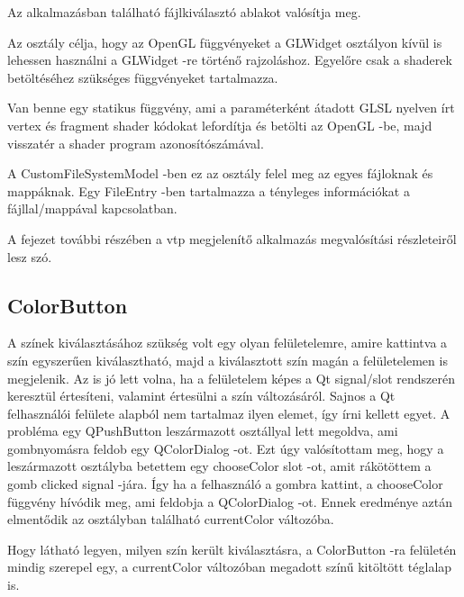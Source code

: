 \begin{description}[font=\normalfont\itshape\bfseries\space]
\item [OpenFileDialog:]
Az alkalmazásban található fájlkiválasztó ablakot valósítja meg.
\item [OpenGLInterface:]
Az osztály célja, hogy az OpenGL függvényeket 
a {\ttfamily GLWidget} osztályon kívül is lehessen használni 
a {\ttfamily GLWidget} -re történő rajzoláshoz. 
Egyelőre csak a shaderek betöltéséhez 
szükséges függvényeket tartalmazza.
\item [ShaderLoader:]
Van benne egy statikus függvény, 
ami a paraméterként átadott GLSL nyelven írt vertex 
és fragment shader kódokat lefordítja és betölti az OpenGL -be, 
majd visszatér a shader program azonosítószámával.
\item [TreeItem:]
A {\ttfamily CustomFileSystemModel} -ben ez az osztály felel meg 
az egyes fájloknak és mappáknak.
Egy {\ttfamily FileEntry} -ben tartalmazza a tényleges információkat 
a fájllal/mappával kapcsolatban.
\end{description}

A fejezet további részében a vtp megjelenítő alkalmazás megvalósítási részleteiről lesz szó.

\subsection{ColorButton}

A színek kiválasztásához szükség volt egy olyan felületelemre, 
amire kattintva a szín egyszerűen kiválasztható, 
majd a kiválasztott szín magán a felületelemen is megjelenik. 
Az is jó lett volna, ha a felületelem képes a 
Qt signal/slot rendszerén keresztül értesíteni, 
valamint értesülni a szín változásáról. 
Sajnos a Qt felhasználói felülete alapból nem tartalmaz ilyen elemet, 
így írni kellett egyet. 
A probléma egy {\ttfamily QPushButton} leszármazott osztállyal lett megoldva, 
ami gombnyomásra feldob egy {\ttfamily QColorDialog} -ot. 
Ezt úgy valósítottam meg, 
hogy a leszármazott osztályba betettem 
egy {\ttfamily chooseColor} slot -ot, 
amit rákötöttem a gomb {\ttfamily clicked} signal -jára. 
Így ha a felhasználó a gombra kattint,
a {\ttfamily chooseColor} függvény hívódik meg,
ami feldobja a {\ttfamily QColorDialog} -ot.
Ennek eredménye aztán elmentődik 
az osztályban található {\ttfamily currentColor} változóba. 

Hogy látható legyen, 
milyen szín került kiválasztásra, 
a {\ttfamily ColorButton} -ra felületén mindig szerepel egy, 
a {\ttfamily currentColor} változóban megadott színű kitöltött téglalap is. 

